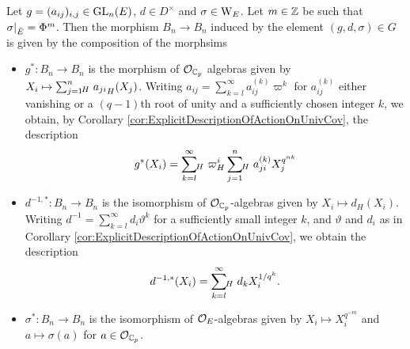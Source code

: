 \documentclass[../main.tex]{subfiles}
\begin{document}
\begin{lem}\label{lem:ExplicitActionOnQthPowerRootSystems}
  Let $g = (a_{ij})_{i,j} \in \operatorname{GL}_n(E)$, $d \in D^\times$ and $\sigma \in
  \mathrm W_E$. Let $m \in \mathbb{Z}$ be such that $\sigma|_{{\breve {E}}} = \Phi^m$. Then the
  morphism $B_n \to B_n$ induced by the element $(g, d, \sigma) \in G$ is given by
  the composition of the morphsims
  \begin{itemize}
    \item $g^*\colon B_n \to B_n$ is the morphism of $\mathcal{O}_{\mathbb{C}_p}$ algebras given
      by $X_i \mapsto \sum_{j=1}^n {\hspace{-3pt}}_H\hspace{3pt} {a_{ji}}_H(X_j)$. Writing
      $a_{ij} = \sum_{k=l}^\infty a_{ij}^{(k)} \varpi^k$ for  $a_{ij}^{(k)}$
      either vanishing or a $(q-1)$th root of unity and a sufficiently chosen integer
      $k$, we obtain, by Corollary
      \ref{cor:ExplicitDescriptionOfActionOnUnivCov}, the description
      \begin{equation*}
        g^*(X_i) = \sum_{k=l}^\infty {\hspace{-3pt}}_H\hspace{3pt} \varpi^i_H
        \sum_{j=1}^n{\hspace{-3pt}}_H\hspace{3pt} a_{ji}^{(k)} X_j^{q^{nk}}
      \end{equation*}
      
    \item $d^{-1,*} \colon B_n \to B_n$ is the isomorphism of 
      $\mathcal{O}_{\mathbb{C}_p}$-algebras given by $X_i \mapsto d_H(X_i)$. 
      Writing $d^{-1} = \sum_{k=l}^\infty d_i \vartheta^k$ for
       a sufficiently small integer $k$, and $\vartheta$ and $d_i$ as in
       Corollary \ref{cor:ExplicitDescriptionOfActionOnUnivCov}, we obtain the
       description
      \begin{equation*}
        d^{-1, *}(X_i) =  \sum_{k=l}^\infty {\hspace{-3pt}}_H\hspace{3pt}
        d_k X_i^{1/q^k}.
      \end{equation*}

    \item $\sigma^*: B_n \to B_n$ is the isomorphism of 
      $\mathcal{O}_E$-algebras given by $X_i \mapsto X_i^{q^{-m}}$ and 
      $a \mapsto \sigma(a)$ for $a \in \mathcal{O}_{\mathbb{C}_p}$. 
  \end{itemize}
\end{lem}
\end{document}

